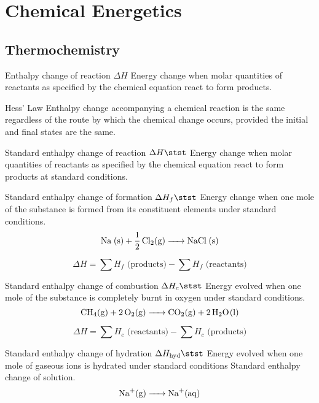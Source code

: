 \section{Chemical Energetics}
\subsection{Thermochemistry}
\begin{defn}{Enthalpy change of reaction $\Delta H$}{}
Energy change when molar quantities of reactants as specified by the chemical equation react to form products.
\end{defn}

\begin{defn}{Hess' Law}{}
Enthalpy change accompanying a chemical reaction is the same regardless of the route by which the chemical change occurs, provided the initial and final states are the same.
\end{defn}

\begin{defn}{Standard enthalpy change of reaction $\Delta H\stst$}{}
Energy change when molar quantities of reactants as specified by the chemical equation react to form products at standard conditions.
\end{defn}

\begin{defn}{Standard enthalpy change of formation $\Delta H_f\stst$}{}
Energy change when one mole of the substance is formed from its constituent elements under standard conditions.
\[ \ce{Na (s) + 1/2 Cl2(g) -> NaCl (s)} \]
\end{defn}

\begin{equation}
\Delta H=\sum H_f\text{ (products)}-\sum H_f\text{ (reactants)}
\end{equation}

\begin{defn}{Standard enthalpy change of combustion $\Delta H_c\stst$}{}
Energy evolved when one mole of the substance is completely burnt in oxygen under standard conditions.
\[ \ce{CH4(g) + 2 O2(g) -> CO2(g) + 2 H2O(l)} \]
\end{defn}

\begin{equation}
\Delta H=\sum H_c\text{ (reactants)}-\sum H_c\text{ (products)}
\end{equation}

\begin{defn}{Standard enthalpy change of hydration $\Delta H_{\mathrm{hyd}}\stst$}{}
Energy evolved when one mole of gaseous ions is hydrated under standard conditions
Standard enthalpy change of solution.
\[ \ce{Na^+(g) -> Na^+(aq)} \]
\end{defn}

